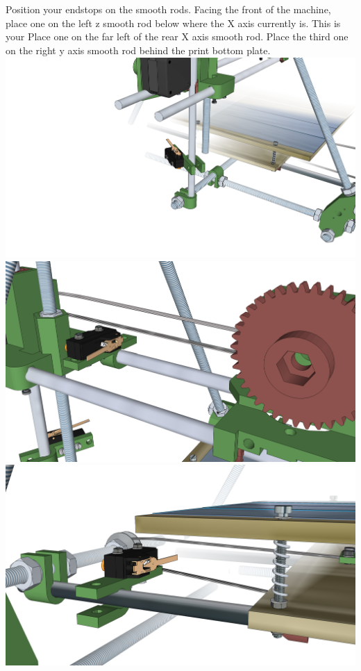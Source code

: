 \documentclass[twoside,openany,a4paper,titlepage]{memoir}
\begin{document}
	\section{}
	Position your endstops on the smooth rods. Facing the front of the machine, place one on the left z
	smooth rod below where the X axis currently is. This is your Place one on the far left of the rear X axis
	smooth rod. Place the third one on the right y axis smooth rod behind the print bottom plate.\\
	\includegraphics[width=1\linewidth]{graphics/ch10_4_1.png}
	\includegraphics[width=1\linewidth]{graphics/ch10_4_2.png}
	\includegraphics[width=1\linewidth]{graphics/ch10_4_3.png}
	
\end{document}
